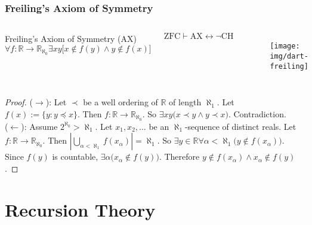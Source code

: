 \documentclass[UTF8,aspectratio=43,11pt,colorlinks,compress,openany]{beamer}%
\begin{document}
\begin{frame}\frametitle{Freiling's Axiom of Symmetry}
\begin{columns}
\begin{block}{Freiling's Axiom of Symmetry (AX)}
\[\forall f:\mathbb{R}\to\mathbb{R}_{\aleph_0}\exists xy\big[x\notin f(y)\wedge y\notin f(x)\big]\]
\end{block}
\begin{theorem}
\[\mathrm{ZFC}\vdash \mathrm{AX}\leftrightarrow\neg \mathrm{CH}\]
\end{theorem}
	\begin{figure}
		\texttt{[image: img/dart-freiling]}
	\end{figure}
\end{columns}
\begin{proof}
($\to$): Let $\prec$ be a well ordering of $\mathbb{R}$ of length $\aleph_1$. Let $f(x):=\{y: y\preceq x\}$. Then $f:\mathbb{R}\to\mathbb{R}_{\aleph_0}$. So $\exists xy\big(x\prec y\wedge y\prec x\big)$. Contradiction.\\
($\leftarrow$): Assume $2^{\aleph_0}>\aleph_1$. Let $x_1,x_2,\dots$ be an $\aleph_1$-sequence of distinct reals. Let $f: \mathbb{R}\to\mathbb{R}_{\aleph_0}$. Then $\left|\bigcup\limits_{\alpha<\aleph_1}f(x_\alpha)\right|=\aleph_1$. So $\exists y\in\mathbb{R}\forall \alpha<\aleph_1\big(y\notin f(x_\alpha)\big)$. Since $f(y)$ is countable, $\exists \alpha\big(x_\alpha\notin f(y)\big)$. Therefore $y\notin f(x_\alpha)\wedge x_\alpha\notin f(y)$.
\end{proof}
\end{frame}


\section{Recursion Theory}
\end{document}
